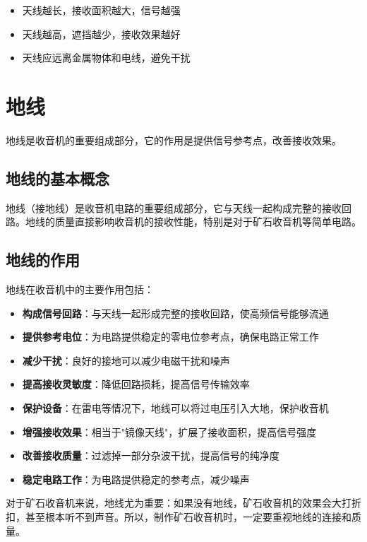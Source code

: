 \documentclass[12pt,UTF8]{ctexbook}
\begin{document}
   \begin{itemize}[leftmargin=3.5em]
       \item 天线越长，接收面积越大，信号越强
       \item 天线越高，遮挡越少，接收效果越好
       \item 天线应远离金属物体和电线，避免干扰
   \end{itemize}

\section{地线}

地线是收音机的重要组成部分，它的作用是提供信号参考点，改善接收效果。

\subsection{地线的基本概念}

地线（接地线）是收音机电路的重要组成部分，它与天线一起构成完整的接收回路。地线的质量直接影响收音机的接收性能，特别是对于矿石收音机等简单电路。

\subsection{地线的作用}

地线在收音机中的主要作用包括：

\begin{itemize}[leftmargin=3.5em]
    \item \textbf{构成信号回路}：与天线一起形成完整的接收回路，使高频信号能够流通
    \item \textbf{提供参考电位}：为电路提供稳定的零电位参考点，确保电路正常工作
    \item \textbf{减少干扰}：良好的接地可以减少电磁干扰和噪声
    \item \textbf{提高接收灵敏度}：降低回路损耗，提高信号传输效率
    \item \textbf{保护设备}：在雷电等情况下，地线可以将过电压引入大地，保护收音机
    \item \textbf{增强接收效果}：相当于"镜像天线"，扩展了接收面积，提高信号强度
    \item \textbf{改善接收质量}：过滤掉一部分杂波干扰，提高信号的纯净度
    \item \textbf{稳定电路工作}：为电路提供稳定的参考点，减少噪声
\end{itemize}

对于矿石收音机来说，地线尤为重要：如果没有地线，矿石收音机的效果会大打折扣，甚至根本听不到声音。所以，制作矿石收音机时，一定要重视地线的连接和质量。
\end{document}
